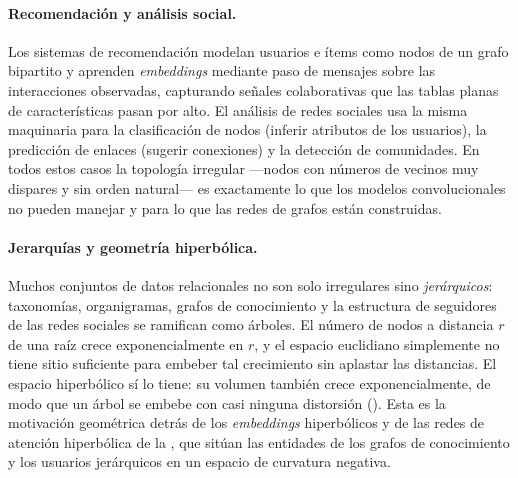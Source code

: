 \paragraph{Recomendaci\'on y an\'alisis social.}
Los sistemas de recomendaci\'on modelan usuarios e \'items como nodos de un grafo
bipartito y aprenden \emph{embeddings} mediante paso de mensajes sobre las
interacciones observadas, capturando se\~nales colaborativas que las tablas
planas de caracter\'isticas pasan por alto. El an\'alisis de redes sociales usa la
misma maquinaria para la clasificaci\'on de nodos (inferir atributos de los
usuarios), la predicci\'on de enlaces (sugerir conexiones) y la detecci\'on de
comunidades. En todos estos casos la topolog\'ia irregular ---nodos con n\'umeros
de vecinos muy dispares y sin orden natural--- es exactamente lo que los modelos
convolucionales no pueden manejar y para lo que las redes de grafos est\'an
construidas.

\paragraph{Jerarqu\'ias y geometr\'ia hiperb\'olica.}
Muchos conjuntos de datos relacionales no son solo irregulares sino
\emph{jer\'arquicos}: taxonom\'ias, organigramas, grafos de conocimiento y la
estructura de seguidores de las redes sociales se ramifican como \'arboles. El
n\'umero de nodos a distancia $r$ de una ra\'iz crece exponencialmente en $r$, y
el espacio euclidiano simplemente no tiene sitio suficiente para embeber tal
crecimiento sin aplastar las distancias. El espacio hiperb\'olico s\'i lo tiene:
su volumen tambi\'en crece exponencialmente, de modo que un \'arbol se embebe con
casi ninguna distorsi\'on (). Esta es la motivaci\'on
geom\'etrica detr\'as de los \emph{embeddings} hiperb\'olicos y de las redes de
atenci\'on hiperb\'olica de la , que sit\'uan las
entidades de los grafos de conocimiento y los usuarios jer\'arquicos en un
espacio de curvatura negativa.

